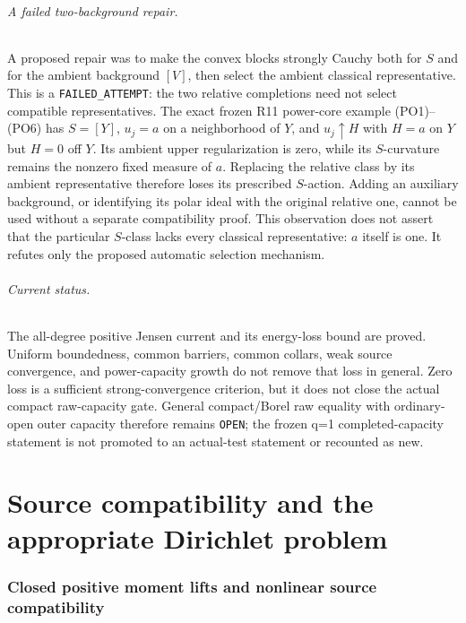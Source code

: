 \documentclass[11pt,a4paper]{article}
\numberwithin{equation}{section}
\theoremstyle{definition}
\theoremstyle{remark}
\begin{document}
\paragraph{A failed two-background repair.}
A proposed repair was to make the convex blocks strongly Cauchy
both for $S$ and for the ambient background $[V]$, then select
the ambient classical representative.  This is a
\texttt{FAILED\_ATTEMPT}: the two relative completions need not
select compatible representatives.  The exact frozen R11
power-core example (PO1)--(PO6) has $S=[Y]$, $u_j=a$ on a
neighborhood of $Y$, and $u_j\uparrow H$ with $H=a$ on $Y$
but $H=0$ off $Y$.  Its ambient upper regularization is zero,
while its $S$-curvature remains the nonzero fixed measure of
$a$.  Replacing the relative class by its ambient representative
therefore loses its prescribed $S$-action.  Adding an auxiliary
background, or identifying its polar ideal with the original
relative one, cannot be used without a separate compatibility
proof.  This observation does not assert that the particular
$S$-class lacks every classical representative: $a$ itself is
one.  It refutes only the proposed automatic selection mechanism.

\paragraph{Current status.}
The all-degree positive Jensen current and its energy-loss bound
are proved.  Uniform boundedness, common barriers, common collars,
weak source convergence, and power-capacity growth do not remove
that loss in general.  Zero loss is a sufficient strong-convergence
criterion, but it does not close the actual compact raw-capacity
gate.  General compact/Borel raw equality with ordinary-open outer
capacity therefore remains \texttt{OPEN}; the frozen q=1
completed-capacity statement is not promoted to an actual-test
statement or recounted as new.



\part{Source compatibility and the appropriate Dirichlet problem}

\section{Closed positive moment lifts and nonlinear source compatibility}
\label{sec:r12-positive-moment-lifts}
\end{document}
